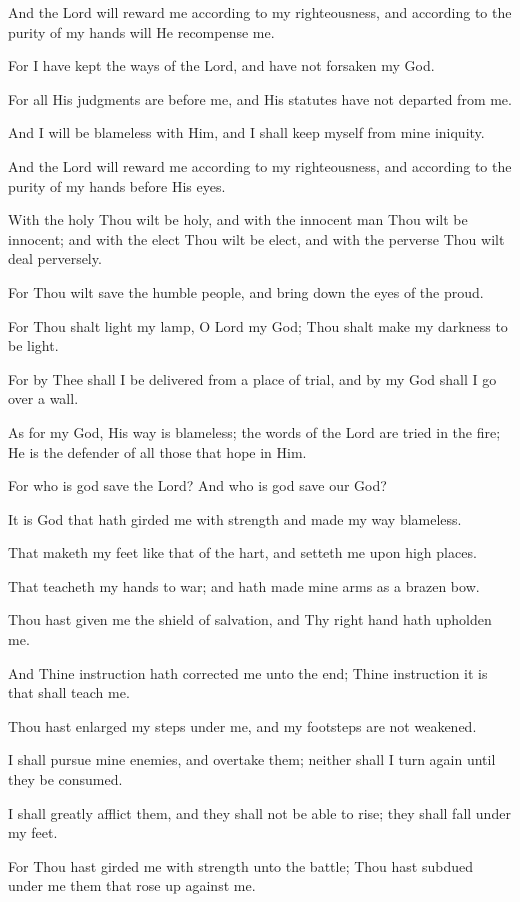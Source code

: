 And the Lord will reward me according to my righteousness, and according to the purity of my hands will He recompense me.

For I have kept the ways of the Lord, and have not forsaken my God.

For all His judgments are before me, and His statutes have not departed from me.

And I will be blameless with Him, and I shall keep myself from mine iniquity.

And the Lord will reward me according to my righteousness, and according to the purity of my hands before His eyes.

With the holy Thou wilt be holy, and with the innocent man Thou wilt be innocent; and with the elect Thou wilt be elect, and with the perverse Thou wilt deal perversely.

For Thou wilt save the humble people, and bring down the eyes of the proud.

For Thou shalt light my lamp, O Lord my God; Thou shalt make my darkness to be light.

For by Thee shall I be delivered from a place of trial, and by my God shall I go over a wall.

As for my God, His way is blameless; the words of the Lord are tried in the fire; He is the defender of all those that hope in Him.

For who is god save the Lord? And who is god save our God?

It is God that hath girded me with strength and made my way blameless.

That maketh my feet like that of the hart, and setteth me upon high places.

That teacheth my hands to war; and hath made mine arms as a brazen bow.

Thou hast given me the shield of salvation, and Thy right hand hath upholden me.

And Thine instruction hath corrected me unto the end; Thine instruction it is that shall teach me.

Thou hast enlarged my steps under me, and my footsteps are not weakened.

I shall pursue mine enemies, and overtake them; neither shall I turn again until they be consumed.

I shall greatly afflict them, and they shall not be able to rise; they shall fall under my feet.

For Thou hast girded me with strength unto the battle; Thou hast subdued under me them that rose up against me.

